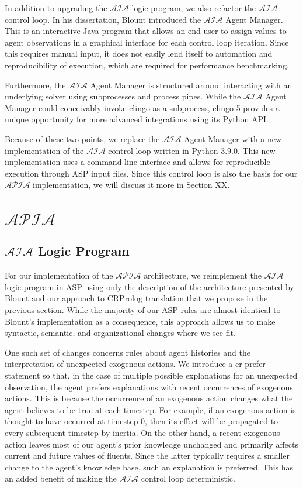 In addition to upgrading the $\mathcal{AIA}$ logic program, we also refactor the $\mathcal{AIA}$ control loop.
In his dissertation, Blount introduced the $\mathcal{AIA}$ Agent Manager.
This is an interactive Java program that allows an end-user to assign values to agent observations in a graphical interface for each control loop iteration.
Since this requires manual input, it does not easily lend itself to automation and reproducibility of execution, which are required for performance benchmarking.

Furthermore, the $\mathcal{AIA}$ Agent Manager is structured around interacting with an underlying solver using subprocesses and process pipes.
While the $\mathcal{AIA}$ Agent Manager could conceivably invoke clingo as a subprocess, clingo 5 provides a unique opportunity for more advanced integrations using its Python API.

Because of these two points, we replace the $\mathcal{AIA}$ Agent Manager with a new implementation of the $\mathcal{AIA}$ control loop written in Python 3.9.0.
This new implementation uses a command-line interface and allows for reproducible execution through ASP input files.
Since this control loop is also the basis for our $\mathcal{APIA}$ implementation, we will discuss it more in Section XX.

\section{$\mathcal{APIA}$}

\subsection{$\mathcal{AIA}$ Logic Program}

For our implementation of the $\mathcal{APIA}$ architecture, we re­implement the $\mathcal{AIA}$ logic program in ASP using only the description of the architecture presented by Blount and our approach to CR­Prolog translation that we propose in the previous section.
While the majority of our ASP rules are almost identical to Blount's implementation as a consequence, this approach allows us to make syntactic, semantic, and organizational changes where we see fit.

One such set of changes concerns rules about agent histories and the interpretation of unexpected exogenous actions.
We introduce a cr-prefer statement so that, in the case of multiple possible explanations for an unexpected observation, the agent prefers explanations with recent occurrences of exogenous actions.
This is because the occurrence of an exogenous action changes what the agent believes to be true at each timestep.
For example, if an exogenous action is thought to have occurred at timestep 0, then its effect will be propagated to every subsequent timestep by inertia.
On the other hand, a recent exogenous action leaves most of our agent's prior knowledge unchanged and primarily affects current and future values of fluents.
Since the latter typically requires a smaller change to the agent's knowledge base, such an explanation is preferred.
This has an added benefit of making the $\mathcal{AIA}$ control loop deterministic.


